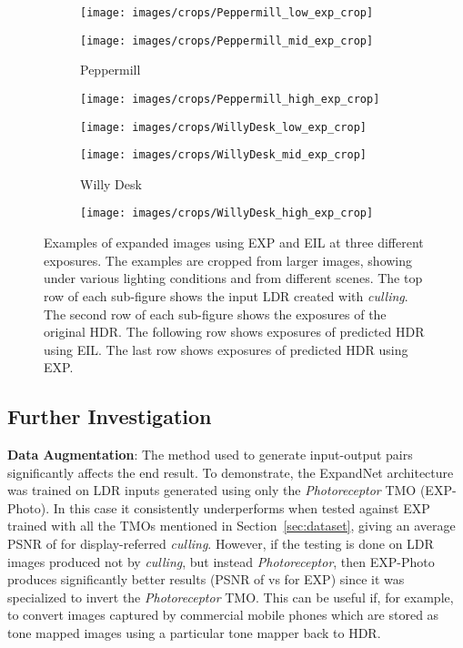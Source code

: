 \documentclass{egpubl}
\newcommand{\tc}[1]{{#1}}
\begin{document}
\begin{figure*}[htb]
    \begin{subfigure}[t]{0.13\linewidth}
        \centering
        \texttt{[image: images/crops/Peppermill\_low\_exp\_crop]}
    \end{subfigure}
    \begin{subfigure}[t]{0.13\linewidth}
        \centering
        \texttt{[image: images/crops/Peppermill\_mid\_exp\_crop]}
        \caption{Peppermill}\label{fig:exposures:peppermill}
    \end{subfigure}
    \begin{subfigure}[t]{0.13\linewidth}
        \centering
        \texttt{[image: images/crops/Peppermill\_high\_exp\_crop]}
    \end{subfigure}
    \begin{subfigure}[t]{0.13\linewidth}
        \centering
        \texttt{[image: images/crops/WillyDesk\_low\_exp\_crop]}
    \end{subfigure}
    \begin{subfigure}[t]{0.13\linewidth}
        \centering
        \texttt{[image: images/crops/WillyDesk\_mid\_exp\_crop]}
        \caption{Willy Desk}\label{fig:exposures:willydesk}
    \end{subfigure}
    \begin{subfigure}[t]{0.13\linewidth}
        \centering
        \texttt{[image: images/crops/WillyDesk\_high\_exp\_crop]}
    \end{subfigure}
    \caption{\tc{Examples of expanded images using EXP and EIL at three
    different exposures. The examples are cropped from larger images, showing
    under various lighting conditions and from different scenes. The top row of
    each sub-figure shows the input LDR created with \textit{culling}. The
    second row of each sub-figure shows the exposures of the original HDR. The
    following row shows exposures of predicted HDR using EIL. The last row
    shows exposures of predicted HDR using EXP.}}\label{fig:exposures}
\end{figure*}
 
\subsection{\textbf{Further Investigation}}
\label{sec:results:further}
\noindent
\tc{\textbf{Data Augmentation}: The method used to generate input-output pairs
significantly affects the end result. To demonstrate, the ExpandNet architecture
was trained on LDR inputs generated using only the \textit{Photoreceptor} TMO
(EXP-Photo). In this case it consistently underperforms when tested against EXP trained with
all the TMOs mentioned in Section~\ref{sec:dataset}, giving an average PSNR of
 for display-referred \textit{culling}. However, if the testing is done
on LDR images produced not by \textit{culling}, but instead
\textit{Photoreceptor}, then EXP-Photo produces significantly better results
(PSNR of  vs  for EXP) since it was specialized to invert
the \textit{Photoreceptor} TMO. This can be useful if, for example, to convert
images captured by commercial mobile phones which are stored as tone mapped images using
a particular tone mapper back to HDR.}
\end{document}
